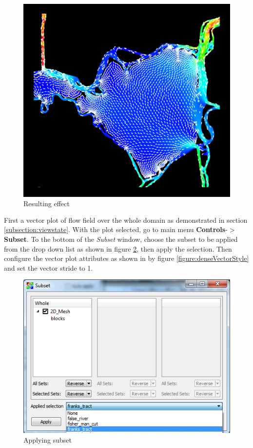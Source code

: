 \documentclass[12pt]{report}
\begin{document}
\begin{figure}
\begin{center}
\includegraphics{franksTractCombinedVel}
\caption{Resulting effect}
\label{figure:franksTractCombinedVel}
\end{center}
\end{figure} 	


First a vector plot of flow field over the whole domain as demonstrated in section \ref{subsection:viewstate}. 
With the plot selected, go to main menu {\bf Controls}-$>${\bf Subset}. To the bottom of the \emph{Subset} window,
choose the subset to be applied from the drop down list as shown in figure \ref{figure:subsetsApply}, then apply 
the selection.  Then configure the vector plot attributes as shown in by figure \ref{figure:denseVectorStyle} and
set the vector stride to 1.

\begin{figure}
\begin{center}
\includegraphics{subsetsApply}
\caption{Applying subset}
\label{figure:subsetsApply}
\end{center}
\end{figure} 
\end{document}
